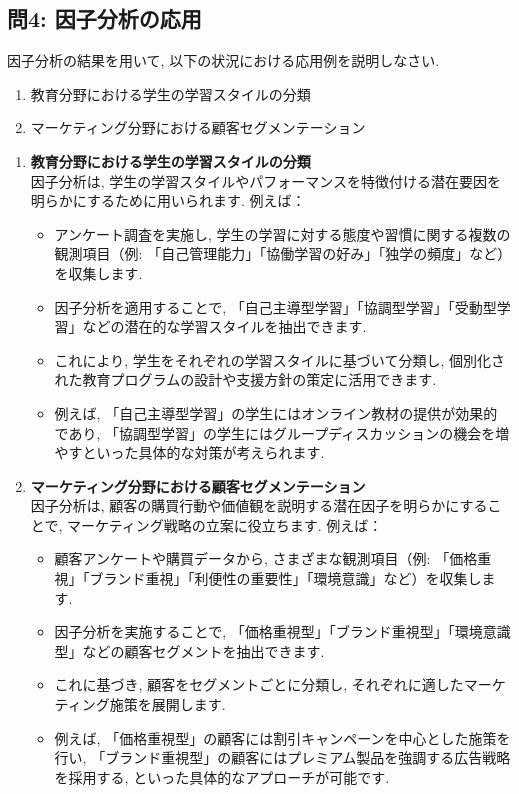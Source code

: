 \documentclass[dvipdfmx, 10pt]{jsarticle}
\begin{document}
\subsection*{問4: 因子分析の応用}
因子分析の結果を用いて, 以下の状況における応用例を説明しなさい. 
\begin{enumerate}
    \item 教育分野における学生の学習スタイルの分類
    \item マーケティング分野における顧客セグメンテーション
\end{enumerate}

\begin{enumerate}
    \item \textbf{教育分野における学生の学習スタイルの分類} \\
    因子分析は, 学生の学習スタイルやパフォーマンスを特徴付ける潜在要因を明らかにするために用いられます. 例えば：
    \begin{itemize}
        \item アンケート調査を実施し, 学生の学習に対する態度や習慣に関する複数の観測項目（例: 「自己管理能力」「協働学習の好み」「独学の頻度」など）を収集します. 
        \item 因子分析を適用することで, 「自己主導型学習」「協調型学習」「受動型学習」などの潜在的な学習スタイルを抽出できます. 
        \item これにより, 学生をそれぞれの学習スタイルに基づいて分類し, 個別化された教育プログラムの設計や支援方針の策定に活用できます. 
        \item 例えば, 「自己主導型学習」の学生にはオンライン教材の提供が効果的であり, 「協調型学習」の学生にはグループディスカッションの機会を増やすといった具体的な対策が考えられます. 
    \end{itemize}

    \item \textbf{マーケティング分野における顧客セグメンテーション} \\
    因子分析は, 顧客の購買行動や価値観を説明する潜在因子を明らかにすることで, マーケティング戦略の立案に役立ちます. 例えば：
    \begin{itemize}
        \item 顧客アンケートや購買データから, さまざまな観測項目（例: 「価格重視」「ブランド重視」「利便性の重要性」「環境意識」など）を収集します. 
        \item 因子分析を実施することで, 「価格重視型」「ブランド重視型」「環境意識型」などの顧客セグメントを抽出できます. 
        \item これに基づき, 顧客をセグメントごとに分類し, それぞれに適したマーケティング施策を展開します. 
        \item 例えば, 「価格重視型」の顧客には割引キャンペーンを中心とした施策を行い, 「ブランド重視型」の顧客にはプレミアム製品を強調する広告戦略を採用する, といった具体的なアプローチが可能です. 
    \end{itemize}
\end{enumerate}
\end{document}
